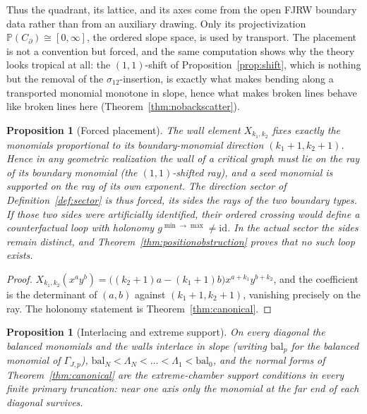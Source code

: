 \documentclass[11pt]{amsart}
\newtheorem{proposition}[theorem]{Proposition}
\theoremstyle{definition}
\theoremstyle{remark}
\begin{document}
Thus the quadrant, its lattice, and its axes come from the open FJRW boundary
data rather than from an auxiliary drawing. Only its projectivization
$\mathbb P(C_{\partial})\cong[0,\infty]$, the ordered slope space, is used by
transport. The placement is not a convention but forced, and the same computation shows why
the theory looks tropical at all: the $(1,1)$-shift of
Proposition~\ref{prop:shift}, which is nothing but the removal of the
$\sigma_{12}$-insertion, is exactly what makes bending along a transported
monomial monotone in slope, hence what makes broken lines behave like broken
lines here (Theorem~\ref{thm:nobackscatter}).


\begin{proposition}[Forced placement]
\label{prop:placement}
The wall element $X_{k_{1},k_{2}}$ fixes exactly the monomials proportional to
its boundary-monomial direction $(k_{1}{+}1,k_{2}{+}1)$. Hence in any geometric
realization the wall of a critical graph must lie on the ray of its boundary
monomial (the $(1,1)$-shifted ray), and a seed monomial is supported on the ray
of its own exponent. The direction sector of Definition~\ref{def:sector} is
thus forced, its sides the rays of the two boundary types.  If those two sides
were artificially identified, their ordered crossing would define a
counterfactual loop with holonomy $g^{\min\to\max}\ne\mathrm{id}$.  In the
actual sector the sides remain distinct, and Theorem~\ref{thm:positionobstruction}
proves that no such loop exists.
\end{proposition}

\begin{proof}
$X_{k_{1},k_{2}}(x^{a}y^{b})=\bigl((k_{2}{+}1)a-(k_{1}{+}1)b\bigr)
x^{a+k_{1}}y^{b+k_{2}}$, and the coefficient is the determinant of $(a,b)$
against $(k_{1}{+}1,k_{2}{+}1)$, vanishing precisely on the ray. The holonomy
statement is Theorem~\ref{thm:canonical}.
\end{proof}

\begin{proposition}[Interlacing and extreme support]
\label{prop:interlace}
On every diagonal the balanced monomials and the walls interlace in slope
(writing $\mathrm{bal}_{p}$ for the balanced monomial of $\Gamma_{J,p}$),
$\mathrm{bal}_{N}<\Lambda_{N}<\dots<\Lambda_{1}<\mathrm{bal}_{0}$, and the
normal forms of Theorem~\ref{thm:canonical} are the extreme-chamber support
conditions in every finite primary truncation: near one axis only the monomial at the far end of each diagonal
survives.
\end{proposition}
\end{document}
